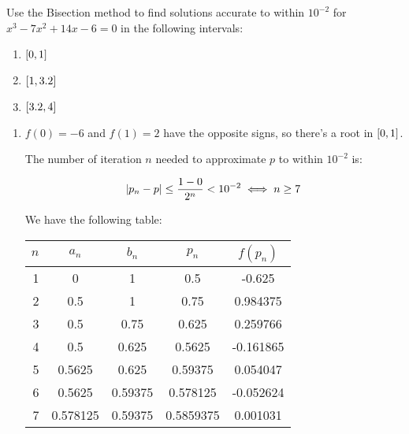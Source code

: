 \documentclass[../../Assignments.tex]{subfiles}
\begin{document}
\begin{exercise}
    Use the Bisection method to find solutions accurate to within \(10^{-2}\)
    for \(x^3 - 7x^2 + 14x - 6 = 0\) in the following intervals:

    \begin{multicols}{3}
        \begin{enumerate}[label = (\alph*)]
            \item \(\interval{0}{1}\)
            \item \(\interval{1}{\num{3.2}}\)
            \item \(\interval{\num{3.2}}{4}\)
        \end{enumerate}
    \end{multicols}
\end{exercise}

\begin{solution}
    \begin{enumerate}[label = (\alph*)]
        \item \(f(0) = -6\) and \(f(1) = 2\) have the opposite signs, so there's
            a root in \(\interval{0}{1}\).

            The number of iteration \(n\) needed to approximate \(p\) to within
            \(10^{-2}\) is:

            \[\abs{p_n - p} \leq \frac{1 - 0}{2^n} < 10^{-2} \iff n \geq 7\]

            We have the following table:

            \begin{table}[H]
                \centering
                \begin{tabular}{r S[table-format=1.6] S[table-format=1.5] S[table-format=1.7] S[table-format=-1.6]}
                    \toprule
                    \(n\)  &  {\(a_n\)}  &  {\(b_n\)}  &  {\(p_n\)}  &  {\(f(p_n)\)}  \\
                      &  0          &  1          &  0.5        &  -0.625        \\
                        2  &  0.5        &  1          &  0.75       &   0.984375     \\
                        3  &  0.5        &  0.75       &  0.625      &   0.259766     \\
                        4  &  0.5        &  0.625      &  0.5625     &  -0.161865     \\
                        5  &  0.5625     &  0.625      &  0.59375    &   0.054047     \\
                        6  &  0.5625     &  0.59375    &  0.578125   &  -0.052624     \\
                        7  &  0.578125   &  0.59375    &  0.5859375  &   0.001031     \\
                    \bottomrule
                \end{tabular}
            \end{table}


\end{enumerate}
\end{solution}
\end{document}
